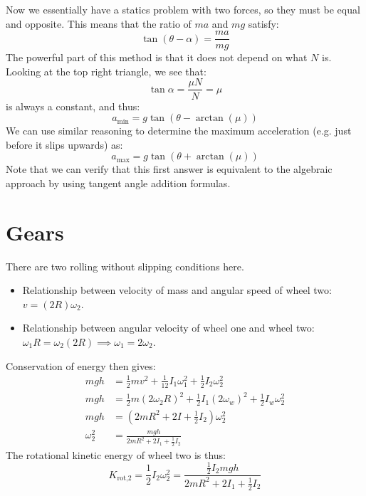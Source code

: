 \documentclass{article}
\begin{document}
Now we essentially have a statics problem with two forces, so they must be equal and opposite. This means that the ratio of $ma$ and $mg$ satisfy:
\begin{equation}
    \tan(\theta-\alpha) = \frac{ma}{mg}
    \label{eq:}
\end{equation}
The powerful part of this method is that it does not depend on what $N$ is. Looking at the top right triangle, we see that:
\begin{equation}
    \tan\alpha = \frac{\mu N}{N} = \mu
    \label{eq:}
\end{equation}
is always a constant, and thus:
\begin{equation}
    a_\text{min} = g\tan(\theta-\arctan(\mu))
    \label{eq:}
\end{equation}
We can use similar reasoning to determine the maximum acceleration (e.g. just before it slips upwards) as:
\begin{equation}
    a_\text{max} = g\tan(\theta+\arctan(\mu))
    \label{eq:}
\end{equation}
Note that we can verify that this first answer is equivalent to the algebraic approach by using tangent angle addition formulas.

\newpage
\section{Gears}
There are two rolling without slipping conditions here.
\begin{itemize}
    \item Relationship between velocity of mass and angular speed of wheel two: $v=(2R)\omega_2$.
    \item Relationship between angular velocity of wheel one and wheel two: $\omega_1R = \omega_2(2R) \implies \omega_1=2\omega_2$.
\end{itemize}
Conservation of energy then gives:
\begin{align}
    mgh &= \frac{1}{2}mv^2+\frac{1}{12}I_1\omega_1^2+\frac{1}{2}I_2\omega_2^2 \\ 
    mgh &= \frac{1}{2}m(2\omega_2 R)^2 + \frac{1}{2}I_1(2\omega_w)^2 + \frac{1}{2}I_w \omega_2^2 \\ 
    mgh &= (2mR^2+2I+\frac{1}{2}I_2)\omega_2^2 \\ 
    \omega_2^2 &= \frac{mgh}{2mR^2+2I_1+\frac{1}{2}I_2}
\end{align}
The rotational kinetic energy of wheel two is thus:
\begin{equation}
    K_\text{rot,2} = \frac{1}{2}I_2\omega_2^2 = \boxed{\frac{\frac{1}{2}I_2mgh}{2mR^2+2I_1+\frac{1}{2}I_2}}
    \label{eq:}
\end{equation}
\end{document}
